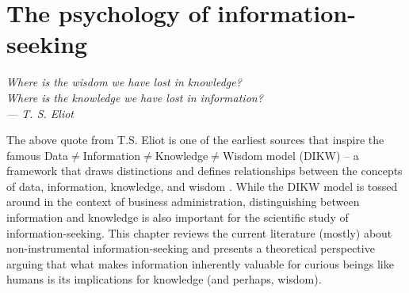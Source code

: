 




\chapter{The psychology of information-seeking}\label{CH2}

\begin{flushright}{\slshape
    Where is the wisdom we have lost in knowledge? \\
    Where is the knowledge we have lost in information? \\
    --- T. S. Eliot \parencite{eliot_rock_2014}}
\end{flushright}
The above quote from T.S. Eliot is one of the earliest sources that inspire the famous Data$\neq$Information$\neq$Knowledge$\neq$Wisdom model (DIKW) -- a framework that draws distinctions and defines relationships between the concepts of data, information, knowledge, and wisdom \parencite{sharma_5_2008}. While the DIKW model is tossed around in the context of business administration, distinguishing between information and knowledge is also important for the scientific study of information-seeking. This chapter reviews the current literature (mostly) about non-instrumental information-seeking and presents a theoretical perspective arguing that what makes information inherently valuable for curious beings like humans is its implications for knowledge (and perhaps, wisdom).

